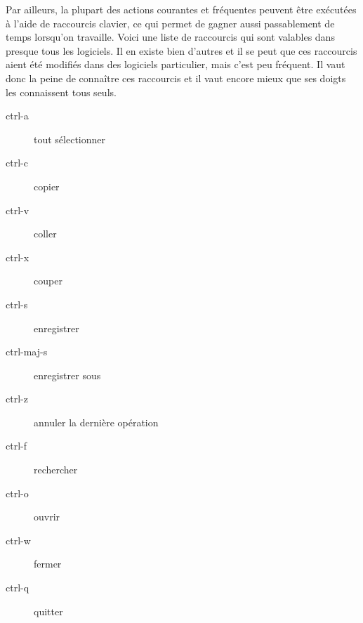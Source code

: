 \documentclass[10pt,a4paper]{report}
\begin{document}
Par ailleurs, la plupart des actions courantes et fréquentes peuvent être exécutées à l'aide de raccourcis clavier, ce qui permet de gagner aussi passablement de temps lorsqu'on travaille. Voici une liste de raccourcis qui sont valables dans presque tous les logiciels. Il en existe bien d'autres et il se peut que ces raccourcis aient été modifiés dans des logiciels particulier, mais c'est peu fréquent. Il vaut donc la peine de connaître ces raccourcis et il vaut encore mieux que ses doigts les connaissent tous seuls.


\begin{description}
	\item[ctrl-a] tout sélectionner
	\item[ctrl-c] copier
	\item[ctrl-v] coller
	\item[ctrl-x] couper
	\item[ctrl-s] enregistrer
	\item[ctrl-maj-s] enregistrer sous
	\item[ctrl-z] annuler la dernière opération
	\item[ctrl-f] rechercher
	\item[ctrl-o] ouvrir
	\item[ctrl-w] fermer
	\item[ctrl-q] quitter
\end{description}










\nocite{CreusetsNet,ENTEnvironnementNumerique,MoodleLCC}
\printbibliography[title=Notes bibliographiques,heading=subbibnumbered]
\end{document}
